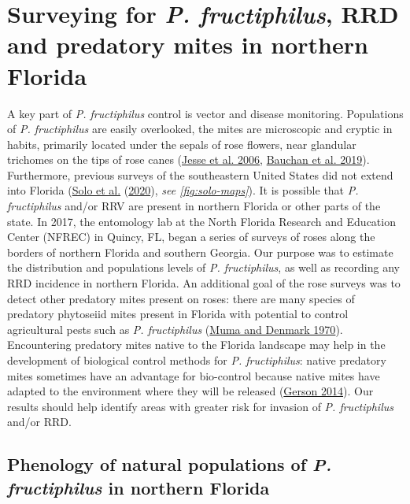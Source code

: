 \documentclass[12pt,final,CPage]{ufthesis}
\begin{document}
{{  \section{\texorpdfstring{Surveying for \emph{P. fructiphilus}, RRD and predatory mites in northern Florida}{Surveying for P. fructiphilus, RRD and predatory mites in northern Florida}}\label{intro-survey}}

  A key part of \emph{P. fructiphilus} control is vector and disease monitoring. Populations of \emph{P. fructiphilus} are easily overlooked, the mites are microscopic and cryptic in habits, primarily located under the sepals of rose flowers, near glandular trichomes on the tips of rose canes (\protect\hyperlink{ref-Jesse2006}{Jesse et al. 2006}, \protect\hyperlink{ref-Bauchan2019}{Bauchan et al. 2019}). Furthermore, previous surveys of the southeastern United States did not extend into Florida (\protect\hyperlink{ref-Solo2020}{Solo et al.} (\protect\hyperlink{ref-Solo2020}{2020}), \emph{see \ref{fig:solo-maps}}). It is possible that \emph{P. fructiphilus} and/or RRV are present in northern Florida or other parts of the state. In 2017, the entomology lab at the North Florida Research and Education Center (NFREC) in Quincy, FL, began a series of surveys of roses along the borders of northern Florida and southern Georgia. Our purpose was to estimate the distribution and populations levels of \emph{P. fructiphilus}, as well as recording any RRD incidence in northern Florida. An additional goal of the rose surveys was to detect other predatory mites present on roses: there are many species of predatory phytoseiid mites present in Florida with potential to control agricultural pests such as \emph{P. fructiphilus} (\protect\hyperlink{ref-Muma1970}{Muma and Denmark 1970}). Encountering predatory mites native to the Florida landscape may help in the development of biological control methods for \emph{P. fructiphilus}: native predatory mites sometimes have an advantage for bio-control because native mites have adapted to the environment where they will be released (\protect\hyperlink{ref-Gerson2014}{Gerson 2014}). Our results should help identify areas with greater risk for invasion of \emph{P. fructiphilus} and/or RRD.

  \hypertarget{intro-pheno}{%
  \subsection{\texorpdfstring{Phenology of natural populations of \emph{P. fructiphilus} in northern Florida}{Phenology of natural populations of P. fructiphilus in northern Florida}}\label{intro-pheno}}

}
\end{document}
